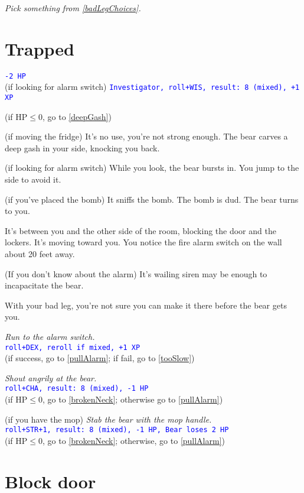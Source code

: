 \documentclass[12pt]{article}
\begin{document}
\textit{Pick something from \ref{badLegChoices}.}

\section{Trapped}\label{trapped}

\texttt{\textcolor{blue}{-2 HP}}\\
(if looking for alarm switch) \texttt{\textcolor{blue}{Investigator, roll+WIS, result:~8 (mixed), +1 XP}}

(if $\text{HP} \le 0$, go to \ref{deepGash})

(if moving the fridge) It's no use, you're not strong enough. The bear carves a deep gash in your side, knocking you back.

(if looking for alarm switch) While you look, the bear bursts in. You jump to the side to avoid it.

(if you've placed the bomb) It sniffs the bomb. The bomb is dud. The bear turns to you.

It's between you and the other side of the room, blocking the door and the lockers. It's moving toward you. You notice the fire alarm switch on the wall about 20 feet away.

(If you don't know about the alarm) It's wailing siren may be enough to
incapacitate the bear.

With your bad leg, you're not sure you can make it there before the bear gets you.

\textit{Run to the alarm switch.}\\
\texttt{\textcolor{blue}{roll+DEX, reroll if mixed, +1 XP}}\\
(if success, go to \ref{pullAlarm}; if fail, go to \ref{tooSlow})

\textit{Shout angrily at the bear.}\\
\texttt{\textcolor{blue}{roll+CHA, result:~8 (mixed), -1 HP}}\\
(if $\text{HP} \le 0$, go to \ref{brokenNeck}; otherwise go to \ref{pullAlarm})

(if you have the mop) \textit{Stab the bear with the mop handle.}\\
\texttt{\textcolor{blue}{roll+STR+1, result:~8 (mixed), -1 HP, Bear loses 2 HP}}\\
(if $\text{HP} \le 0$, go to \ref{brokenNeck}; otherwise, go to \ref{pullAlarm})

\section{Block door}\label{blockDoor}
\end{document}
